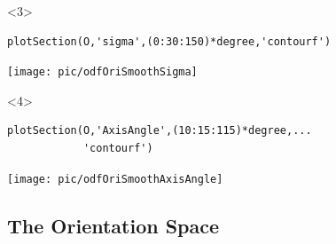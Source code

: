 \documentclass[compress]{beamer}
\begin{document}
\begin{frame}[fragile]
    \begin{onlyenv}<3>
    \begin{lstlisting}[style=input]
plotSection(O,'sigma',(0:30:150)*degree,'contourf')
    \end{lstlisting}
    \vspace{-0.3cm}
    \begin{center}
      \texttt{[image: pic/odfOriSmoothSigma]}
    \end{center}
  \end{onlyenv}

  \begin{onlyenv}<4>
    \begin{lstlisting}[style=input]
plotSection(O,'AxisAngle',(10:15:115)*degree,...
            'contourf')
    \end{lstlisting}
    \vspace{-0.3cm}
    \begin{center}
      \texttt{[image: pic/odfOriSmoothAxisAngle]}
    \end{center}
  \end{onlyenv}

\end{frame}

\subsection*{The Orientation Space}
\end{document}

